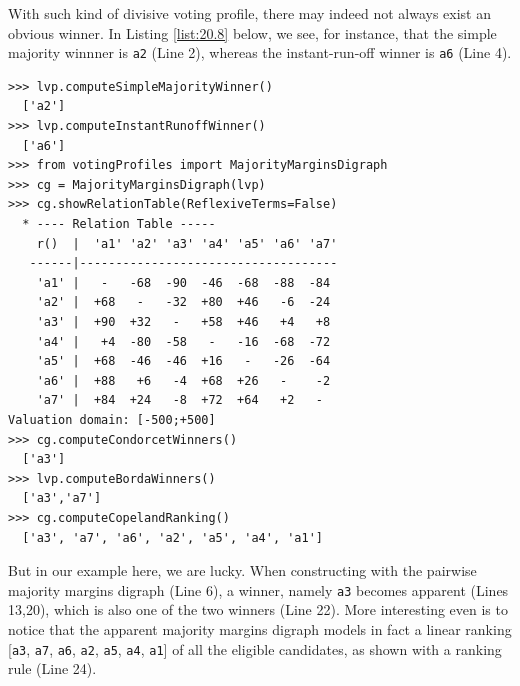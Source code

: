 With such kind of divisive voting profile, there may indeed not always exist an obvious winner. In Listing \ref{list:20.8} below, we see, for instance, that the simple majority winnner is \texttt{a2} (Line 2), whereas the instant-run-off winner is \texttt{a6} (Line 4).
\begin{lstlisting}[caption={Example of non obvious secondary selection},label=list:20.8]
>>> lvp.computeSimpleMajorityWinner()
  ['a2']
>>> lvp.computeInstantRunoffWinner()
  ['a6']
>>> from votingProfiles import MajorityMarginsDigraph
>>> cg = MajorityMarginsDigraph(lvp)
>>> cg.showRelationTable(ReflexiveTerms=False)
  * ---- Relation Table -----
    r()  |  'a1' 'a2' 'a3' 'a4' 'a5' 'a6' 'a7'	  
   ------|------------------------------------
    'a1' |   -   -68  -90  -46  -68  -88  -84	 
    'a2' |  +68   -   -32  +80  +46   -6  -24	 
    'a3' |  +90  +32   -   +58  +46   +4   +8	 
    'a4' |   +4  -80  -58   -   -16  -68  -72	 
    'a5' |  +68  -46  -46  +16	 -   -26  -64	 
    'a6' |  +88   +6   -4  +68	+26   -    -2	 
    'a7' |  +84  +24   -8  +72	+64   +2   - 	 
Valuation domain: [-500;+500]
>>> cg.computeCondorcetWinners()
  ['a3']
>>> lvp.computeBordaWinners()
  ['a3','a7']
>>> cg.computeCopelandRanking()
  ['a3', 'a7', 'a6', 'a2', 'a5', 'a4', 'a1']
\end{lstlisting}
But in our example here, we are lucky. When constructing with the pairwise majority margins digraph (Line 6), a \Condorcet winner, namely \texttt{a3} becomes apparent (Lines 13,20), which is also one of the two \Borda winners (Line 22). More interesting even is to notice that the apparent majority margins digraph models in fact a linear ranking [\texttt{a3}, \texttt{a7}, \texttt{a6}, \texttt{a2}, \texttt{a5}, \texttt{a4}, \texttt{a1}] of all the eligible candidates, as shown with a \Copeland ranking rule (Line 24).

